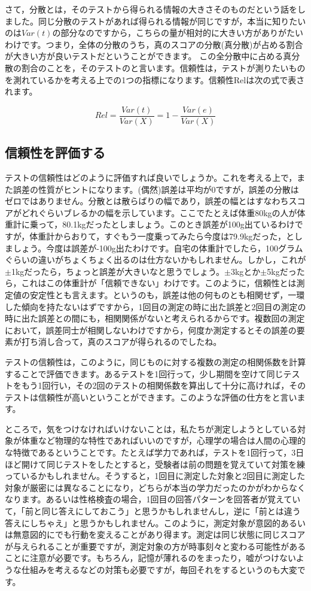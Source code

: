 \documentclass{ltjbook}
\begin{document}
さて，分散とは，そのテストから得られる情報の大きさそのものだという話をしました。同じ分散のテストがあれば得られる情報が同じですが，本当に知りたいのは$Var(t)$の部分なのですから，こちらの量が相対的に大きい方がありがたいわけです。つまり，全体の分散のうち，真のスコアの分散(真分散)が占める割合が大きい方が良いテストだということができます。
この全分散中に占める真分散の割合のことを，そのテストのと言います。信頼性は，テストが測りたいものを測れているかを考える上での1つの指標になります。信頼性Relは次の式で表されます。

\[ Rel = \frac{Var(t)}{Var(X)} = 1 - \frac{Var(e)}{Var(X)} \]


\subsection{信頼性を評価する}
テストの信頼性はどのように評価すれば良いでしょうか。これを考える上で，また誤差の性質がヒントになります。(偶然)誤差は平均が$0$ですが，誤差の分散はゼロではありません。分散とは散らばりの幅であり，誤差の幅とはすなわちスコアがどれぐらいブレるかの幅を示しています。ここでたとえば体重80kgの人が体重計に乗って，80.1kgだったとしましょう。このとき誤差が100g出ているわけですが，体重計からおりて，すぐもう一度乗ってみたら今度は79.9kgだった，としましょう。今度は誤差が-100g出たわけです。自宅の体重計でしたら，100グラムぐらいの違いがちょくちょく出るのは仕方ないかもしれません。しかし，これが$\pm$1kgだったら，ちょっと誤差が大きいなと思うでしょう。$\pm$3kgとか$\pm$5kgだったら，これはこの体重計が「信頼できない」わけです。このように，信頼性とは測定値の安定性とも言えます。というのも，誤差は他の何ものとも相関せず，一環した傾向を持たないはずですから，1回目の測定の時に出た誤差と2回目の測定の時に出た誤差との間にも，相関関係がないと考えられるからです。複数回の測定において，誤差同士が相関しないわけですから，何度か測定するとその誤差の要素が打ち消し合って，真のスコアが得られるのでしたね。

テストの信頼性は，このように，同じものに対する複数の測定の相関係数を計算することで評価できます。あるテストを1回行って，少し期間を空けて同じテストをもう1回行い，その2回のテストの相関係数を算出して十分に高ければ，そのテストは信頼性が高いということができます。このような評価の仕方をと言います。

ところで，気をつけなければいけないことは，私たちが測定しようとしている対象が体重など物理的な特性であればいいのですが，心理学の場合は人間の心理的な特徴であるということです。たとえば学力であれば，テストを1回行って，3日ほど開けて同じテストをしたとすると，受験者は前の問題を覚えていて対策を練っているかもしれません。そうすると，1回目に測定した対象と2回目に測定した対象が厳密には異なることになり，どちらが本当の学力だったのかがわからなくなります。あるいは性格検査の場合，1回目の回答パターンを回答者が覚えていて，「前と同じ答えにしておこう」と思うかもしれませんし，逆に「前とは違う答えにしちゃえ」と思うかもしれません。このように，測定対象が意図的あるいは無意図的にでも行動を変えることがあり得ます。測定は同じ状態に同じスコアが与えられることが重要ですが，測定対象の方が時事刻々と変わる可能性があることに注意が必要です。もちろん，記憶が薄れるのをまったり，嘘がつけないような仕組みを考えるなどの対策も必要ですが，毎回それをするというのも大変です。
\end{document}
